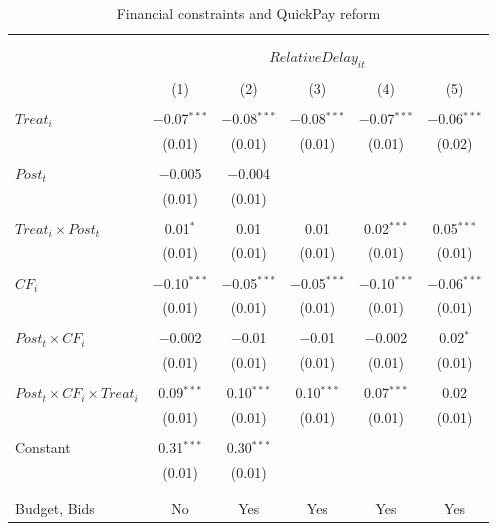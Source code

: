 \documentclass[
]{article}
\begin{document}
\begin{table}[H] \centering 
  \caption{Financial constraints and QuickPay reform} 
  \label{} 
\small 
\begin{tabular}{@{\extracolsep{-2pt}}lccccc} 
\\[-1.8ex]\hline 
\hline \\[-1.8ex] 
\\[-1.8ex] & \multicolumn{5}{c}{$RelativeDelay_{it}$} \\ 
\\[-1.8ex] & (1) & (2) & (3) & (4) & (5)\\ 
\hline \\[-1.8ex] 
 $Treat_i$ & $-$0.07$^{***}$ & $-$0.08$^{***}$ & $-$0.08$^{***}$ & $-$0.07$^{***}$ & $-$0.06$^{***}$ \\ 
  & (0.01) & (0.01) & (0.01) & (0.01) & (0.02) \\ 
  & & & & & \\ 
 $Post_t$ & $-$0.005 & $-$0.004 &  &  &  \\ 
  & (0.01) & (0.01) &  &  &  \\ 
  & & & & & \\ 
 $Treat_i \times Post_t$ & 0.01$^{*}$ & 0.01 & 0.01 & 0.02$^{***}$ & 0.05$^{***}$ \\ 
  & (0.01) & (0.01) & (0.01) & (0.01) & (0.01) \\ 
  & & & & & \\ 
 $CF_i$ & $-$0.10$^{***}$ & $-$0.05$^{***}$ & $-$0.05$^{***}$ & $-$0.10$^{***}$ & $-$0.06$^{***}$ \\ 
  & (0.01) & (0.01) & (0.01) & (0.01) & (0.01) \\ 
  & & & & & \\ 
 $Post_t \times CF_i$ & $-$0.002 & $-$0.01 & $-$0.01 & $-$0.002 & 0.02$^{*}$ \\ 
  & (0.01) & (0.01) & (0.01) & (0.01) & (0.01) \\ 
  & & & & & \\ 
 $Post_t \times CF_i \times Treat_i$ & 0.09$^{***}$ & 0.10$^{***}$ & 0.10$^{***}$ & 0.07$^{***}$ & 0.02 \\ 
  & (0.01) & (0.01) & (0.01) & (0.01) & (0.01) \\ 
  & & & & & \\ 
 Constant & 0.31$^{***}$ & 0.30$^{***}$ &  &  &  \\ 
  & (0.01) & (0.01) &  &  &  \\ 
  & & & & & \\ 
\hline \\[-1.8ex] 
Budget, Bids & No & Yes & Yes & Yes & Yes \\ 

\end{tabular}
\end{table}
\end{document}
